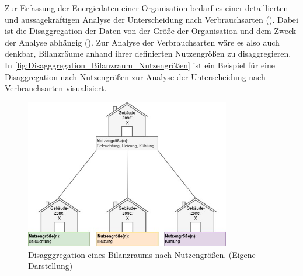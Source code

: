 Zur Erfassung der Energiedaten einer Organisation bedarf es einer detaillierten und aussagekräftigen Analyse der Unterscheidung nach Verbrauchsarten 
(\cite[S. 14]{Hohnhold.2013}). Dabei ist die Disaggregation der Daten von der Größe der Organisation und dem Zweck der Analyse abhängig (\cite[S. 14f.]{Hohnhold.2013}).
Zur Analyse der Verbrauchsarten wäre es also auch denkbar, Bilanzräume anhand ihrer definierten Nutzengrößen zu disaggregieren.
In \eqref{fig:Disagggregation_Bilanzraum_Nutzengrößen} ist ein Beispiel für eine Disaggregation nach Nutzengrößen 
zur Analyse der Unterscheidung nach Verbrauchsarten visualisiert.

\begin{figure}[H]
    \centering
    \includegraphics[width=0.8\textwidth]{../../Ressourcen/Abbildungen/Nutzengröße_Bewertungseinheit_Zerlegt.jpg}
    \caption{Disagggregation eines Bilanzraums nach Nutzengrößen. (Eigene Darstellung)}
    \label{fig:Disagggregation_Bilanzraum_Nutzengrößen}
\end{figure}